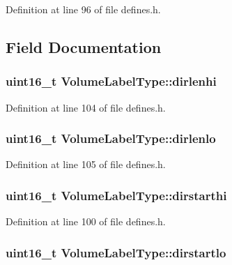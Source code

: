 Definition at line 96 of file defines.\+h.



\subsection{Field Documentation}
\subsubsection[{\texorpdfstring{dirlenhi}{dirlenhi}}]{\setlength{\rightskip}{0pt plus 5cm}uint16\+\_\+t Volume\+Label\+Type\+::dirlenhi}\hypertarget{structVolumeLabelType_a6fa349ef78a7ea0a3006e0c1f4f3a155}{}\label{structVolumeLabelType_a6fa349ef78a7ea0a3006e0c1f4f3a155}


Definition at line 104 of file defines.\+h.

\subsubsection[{\texorpdfstring{dirlenlo}{dirlenlo}}]{\setlength{\rightskip}{0pt plus 5cm}uint16\+\_\+t Volume\+Label\+Type\+::dirlenlo}\hypertarget{structVolumeLabelType_ae1c5205294bf4588b931057d03853d66}{}\label{structVolumeLabelType_ae1c5205294bf4588b931057d03853d66}


Definition at line 105 of file defines.\+h.

\subsubsection[{\texorpdfstring{dirstarthi}{dirstarthi}}]{\setlength{\rightskip}{0pt plus 5cm}uint16\+\_\+t Volume\+Label\+Type\+::dirstarthi}\hypertarget{structVolumeLabelType_aac87a089bec0cf282bf23038937d7635}{}\label{structVolumeLabelType_aac87a089bec0cf282bf23038937d7635}


Definition at line 100 of file defines.\+h.

\subsubsection[{\texorpdfstring{dirstartlo}{dirstartlo}}]{\setlength{\rightskip}{0pt plus 5cm}uint16\+\_\+t Volume\+Label\+Type\+::dirstartlo}\hypertarget{structVolumeLabelType_a193c89f442656a080244f284f1bc008a}{}\label{structVolumeLabelType_a193c89f442656a080244f284f1bc008a}


